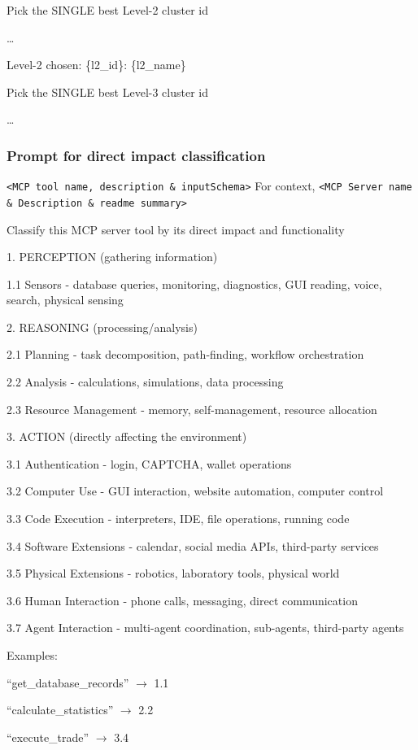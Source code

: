 \documentclass[manuscript,screen,nonacm,oneside]{acmart}
\begin{document}
Pick the SINGLE best Level-2 cluster id

\ldots{}

Level-2 chosen: \{l2\_id\}: \{l2\_name\}

Pick the SINGLE best Level-3 cluster id

\ldots{}

\subsubsection{Prompt for direct impact classification}

\texttt{<MCP tool name, description \& inputSchema>} For context, \texttt{<MCP Server name \& Description \& readme summary>}

Classify this MCP server tool by its direct impact and functionality

1. PERCEPTION (gathering information)

1.1 Sensors - database queries, monitoring, diagnostics, GUI reading, voice, search, physical sensing

2. REASONING (processing/analysis)

2.1 Planning - task decomposition, path-finding, workflow orchestration

2.2 Analysis - calculations, simulations, data processing

2.3 Resource Management - memory, self-management, resource allocation

3. ACTION (directly affecting the environment)

3.1 Authentication - login, CAPTCHA, wallet operations

3.2 Computer Use - GUI interaction, website automation, computer control

3.3 Code Execution - interpreters, IDE, file operations, running code

3.4 Software Extensions - calendar, social media APIs, third-party services

3.5 Physical Extensions - robotics, laboratory tools, physical world

3.6 Human Interaction - phone calls, messaging, direct communication

3.7 Agent Interaction - multi-agent coordination, sub-agents, third-party agents

Examples:

``get\_database\_records'' $\rightarrow$ 1.1

``calculate\_statistics'' $\rightarrow$ 2.2

``execute\_trade'' $\rightarrow$ 3.4
\end{document}
